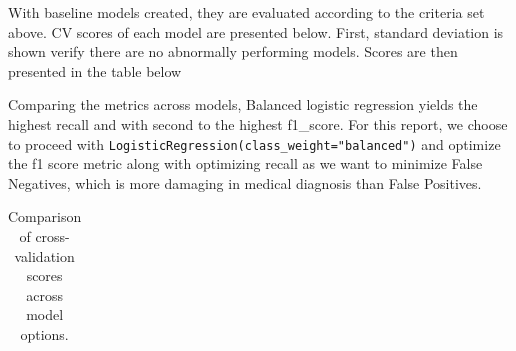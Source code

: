 \documentclass[
  letterpaper,
  DIV=11,
  numbers=noendperiod]{scrartcl}
\begin{document}
With baseline models created, they are evaluated according to the
criteria set above. CV scores of each model are presented below. First,
standard deviation is shown verify there are no abnormally performing
models. Scores are then presented in the table below

Comparing the metrics across models, Balanced logistic regression yields
the highest recall and with second to the highest f1\_score. For this
report, we choose to proceed with
\texttt{LogisticRegression(class\_weight="balanced")} and optimize the
f1 score metric along with optimizing recall as we want to minimize
False Negatives, which is more damaging in medical diagnosis than False
Positives.

\begin{longtable}[]{@{}
  >{\raggedright\arraybackslash}p{}
  >{\raggedleft\arraybackslash}p{}
  >{\raggedleft\arraybackslash}p{}
  >{\raggedleft\arraybackslash}p{}
  >{\raggedleft\arraybackslash}p{}
  >{\raggedleft\arraybackslash}p{}@{}}

\caption{\label{tbl-model-cv-comps}Comparison of cross-validation scores
across model options.}

\tabularnewline


\end{longtable}
\end{document}
